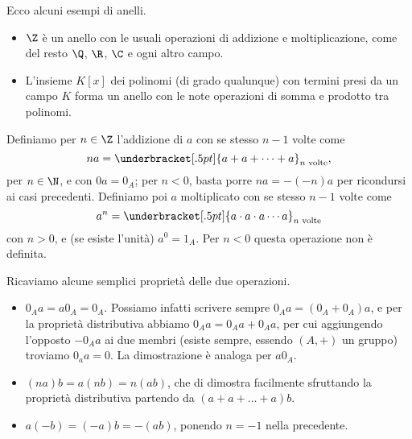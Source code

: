 Ecco alcuni esempi di anelli.
\begin{itemize}
\item $\Z$ è un anello con le usuali operazioni di addizione e moltiplicazione, come del resto $\Q$, $\R$, $\C$ e ogni altro campo.
\item L'insieme $K[x]$ dei polinomi (di grado qualunque) con termini presi da un campo $K$ forma un anello con le note operazioni di somma e prodotto tra polinomi.
\end{itemize}

Definiamo per $n\in\Z$ l'addizione di $a$ con se stesso $n-1$ volte come
\begin{equation}
	na=\underbracket[.5pt]{a+a+\cdots+a}_\textup{$n$ volte},
\end{equation}
per $n\in\N$, e con $0a=0_A$; per $n<0$, basta porre $na=-(-n)a$ per ricondursi ai casi precedenti.
Definiamo poi $a$ moltiplicato con se stesso $n-1$ volte come
\begin{equation}
	a^n=\underbracket[.5pt]{a\cdot a\cdot a\cdots a}_\textup{$n$ volte}
\end{equation}
con $n>0$, e (se esiste l'unità) $a^0=1_A$.
Per $n<0$ questa operazione non è definita.

Ricaviamo alcune semplici proprietà delle due operazioni.
\begin{itemize}
	\item $0_Aa=a0_A=0_A$.
		Possiamo infatti scrivere sempre $0_Aa=(0_A+0_A)a$, e per la proprietà distributiva abbiamo $0_Aa=0_Aa+0_Aa$, per cui aggiungendo l'opposto $-0_Aa$ ai due membri (esiste sempre, essendo $(A,+)$ un gruppo) troviamo $0_aa=0$.
		La dimostrazione è analoga per $a0_A$.
	\item $(na)b=a(nb)=n(ab)$, che di dimostra facilmente sfruttando la proprietà distributiva partendo da $(a+a+\dots+a)b$.
	\item $a(-b)=(-a)b=-(ab)$, ponendo $n=-1$ nella precedente.
\end{itemize}

